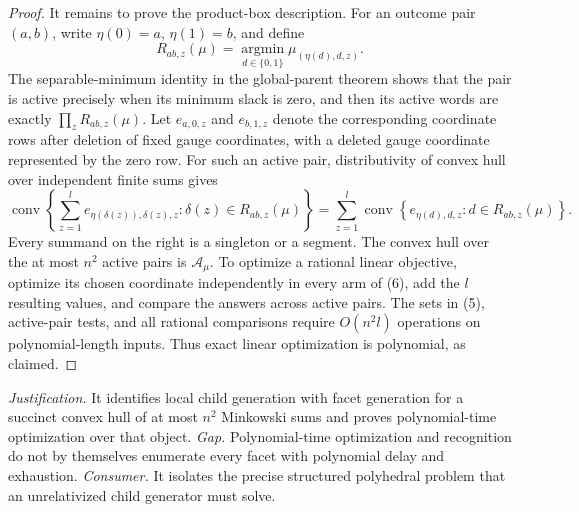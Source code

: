 \documentclass{article}
\begin{document}
\begin{proof}
It remains to prove the product-box description. For an outcome pair \((a,b)\), write \(\eta(0)=a\), \(\eta(1)=b\), and define
\[R_{ab,z}(\mu)=\operatorname*{argmin}_{d\in\{0,1\}}\mu_{(\eta(d),d,z)}.\tag{5}\]
The separable-minimum identity in the global-parent theorem shows that the pair is active precisely when its minimum slack is zero, and then its active words are exactly \(\prod_zR_{ab,z}(\mu)\). Let \(e_{a,0,z}\) and \(e_{b,1,z}\) denote the corresponding coordinate rows after deletion of fixed gauge coordinates, with a deleted gauge coordinate represented by the zero row. For such an active pair, distributivity of convex hull over independent finite sums gives
\[\operatorname{conv}\left\{\sum_{z=1}^le_{\eta(\delta(z)),\delta(z),z}:\delta(z)\in R_{ab,z}(\mu)\right\}
=\sum_{z=1}^l\operatorname{conv}\left\{e_{\eta(d),d,z}:d\in R_{ab,z}(\mu)\right\}.\tag{6}\]
Every summand on the right is a singleton or a segment. The convex hull over the at most \(n^2\) active pairs is \(\mathcal A_\mu\). To optimize a rational linear objective, optimize its chosen coordinate independently in every arm of (6), add the \(l\) resulting values, and compare the answers across active pairs. The sets in (5), active-pair tests, and all rational comparisons require \(O(n^2l)\) operations on polynomial-length inputs. Thus exact linear optimization is polynomial, as claimed.
\end{proof}
\par\smallskip\noindent \textit{Justification.} It identifies local child generation with facet generation for a succinct convex hull of at most \(n^2\) Minkowski sums and proves polynomial-time optimization over that object. \textit{Gap.} Polynomial-time optimization and recognition do not by themselves enumerate every facet with polynomial delay and exhaustion. \textit{Consumer.} It isolates the precise structured polyhedral problem that an unrelativized child generator must solve.
\end{document}
